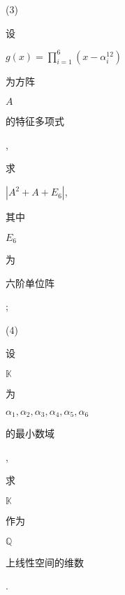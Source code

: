 \documentclass[10pt]{article}
\begin{document}
(3) \begin{CJK}{UTF8}{mj}设\end{CJK} $g(x)=\prod_{i=1}^{6}\left(x-\alpha_{i}^{12}\right)$ \begin{CJK}{UTF8}{mj}为方阵\end{CJK} $A$ \begin{CJK}{UTF8}{mj}的特征多项式\end{CJK}, \begin{CJK}{UTF8}{mj}求\end{CJK} $\left|A^{2}+A+E_{6}\right|$, \begin{CJK}{UTF8}{mj}其中\end{CJK} $E_{6}$ \begin{CJK}{UTF8}{mj}为\end{CJK} \begin{CJK}{UTF8}{mj}六阶单位阵\end{CJK};

(4) \begin{CJK}{UTF8}{mj}设\end{CJK} $\mathbb{K}$ \begin{CJK}{UTF8}{mj}为\end{CJK} $\alpha_{1}, \alpha_{2}, \alpha_{3}, \alpha_{4}, \alpha_{5}, \alpha_{6}$ \begin{CJK}{UTF8}{mj}的最小数域\end{CJK}, \begin{CJK}{UTF8}{mj}求\end{CJK} $\mathbb{K}$ \begin{CJK}{UTF8}{mj}作为\end{CJK} $\mathbb{Q}$ \begin{CJK}{UTF8}{mj}上线性空间的维数\end{CJK}.
\end{document}
